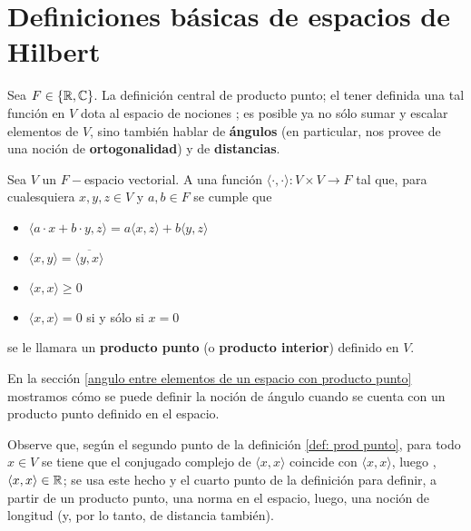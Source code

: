 \section{Definiciones básicas de espacios de Hilbert}

Sea $F \in \{ \mathbb{R}, \mathbb{C} \}$.
La definición central 
de producto punto; el tener definida una tal función 
en $V$ dota al espacio de nociones ;
es posible ya no sólo sumar y escalar elementos de $V$, sino
también hablar de \textbf{ángulos}
(en particular, nos provee de una noción de 
\textbf{ortogonalidad})
y de \textbf{distancias}.


\begin{defi}
\label{def: prod punto}
Sea $V$ un $F-$espacio vectorial. A una función
$\langle \cdot, \cdot \rangle : V \times V \longrightarrow F$
tal que, para cualesquiera $x, y, z \in V$ 
y $a, b \in F$
se cumple que 

	\begin{itemize}
	\item $\langle a \cdot x + b \cdot y, z \rangle = 
	a \langle x, z \rangle + b \langle y, z \rangle$
	\item $\langle x, y \rangle = \overline{\langle y, x \rangle} $
	\item $\langle x, x \rangle \geq 0 $
	\item $\langle x, x \rangle = 0 $ si y sólo si $x=0$
	\end{itemize}
se le llamara un \textbf{producto punto} (o \textbf{producto interior})
definido en $V$.
\end{defi}


En la sección
\ref{angulo entre elementos de un espacio con producto punto}
mostramos cómo se puede definir la noción de ángulo cuando
se cuenta con un producto punto definido en el espacio.


Observe que, según el segundo punto de la definición 
\ref{def: prod punto}, 
para todo $x \in V$ se tiene que el conjugado complejo
de $\langle x, x \rangle$ coincide con $\langle x, x \rangle$, luego
,
$\langle x, x \rangle \in \mathbb{R}$; se usa este hecho 
y el cuarto punto de la definición para definir, 
a partir de un producto punto, una norma
 en el espacio, luego, 
una noción de longitud (y, por lo tanto, de distancia también).

